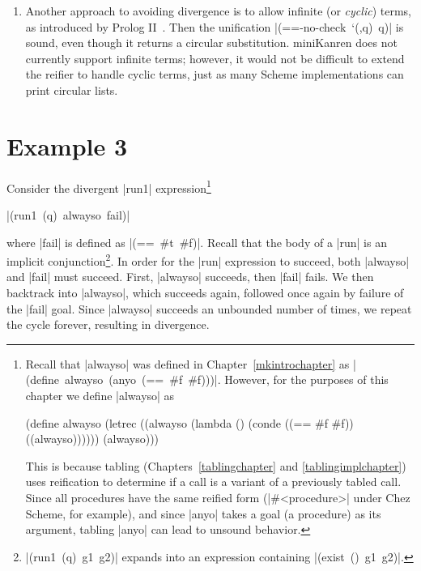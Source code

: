 \begin{enumerate}
\item Another approach to avoiding divergence is to allow infinite (or
  \emph{cyclic}) terms, as introduced by Prolog
  II~\cite{prologtenfigs,DBLP:conf/fgcs/Colmerauer84,Colmerauer82}.
  Then the unification \mbox{\scheme|(==-no-check `(,q) q)|} is sound,
  even though it returns a circular substitution.  miniKanren does not
  currently support infinite terms; however, it would not be difficult
  to extend the reifier to handle cyclic terms, just as many Scheme
  implementations can print circular lists.

\end{enumerate}




\section*{Example 3}

Consider the divergent \scheme|run1| expression\footnote{Recall that
\scheme|alwayso| was defined in Chapter~\ref{mkintrochapter} as
\mbox{\scheme|(define alwayso (anyo (== #f #f)))|}.  However, for the
purposes of this chapter we define \scheme|alwayso| as

\begin{schemedisplay}
(define alwayso
  (letrec ((alwayso (lambda ()
                      (conde
                        ((== #f #f))
                        ((alwayso))))))
    (alwayso)))
\end{schemedisplay}

\noindent This is because tabling (Chapters~\ref{tablingchapter} and
\ref{tablingimplchapter}) uses reification to determine if a call is a
variant of a previously tabled call.  Since all procedures have the
same reified form (\schemeresult|#<procedure>| under Chez Scheme, for
example), and since \scheme|anyo| takes a goal (a procedure) as its
argument, tabling \scheme|anyo| can lead to unsound behavior.}

\wspace

\mbox{\scheme|(run1 (q) alwayso fail)|}

\wspace

\noindent where \scheme|fail| is defined as \mbox{\scheme|(== #t #f)|}.
Recall that the body of a \scheme|run| is an implicit
conjunction\footnote{\mbox{\scheme|(run1 (q) g1 g2)|} expands into an
expression containing \mbox{\scheme|(exist () g1 g2)|}.}.  In order for
the \scheme|run| expression to succeed, both \scheme|alwayso| and
\scheme|fail| must succeed.  First, \scheme|alwayso| succeeds, then
\scheme|fail| fails.  We then backtrack into \scheme|alwayso|, which
succeeds again, followed once again by failure of the \scheme|fail|
goal.  Since \scheme|alwayso| succeeds an unbounded number of times,
we repeat the cycle forever, resulting in divergence.


